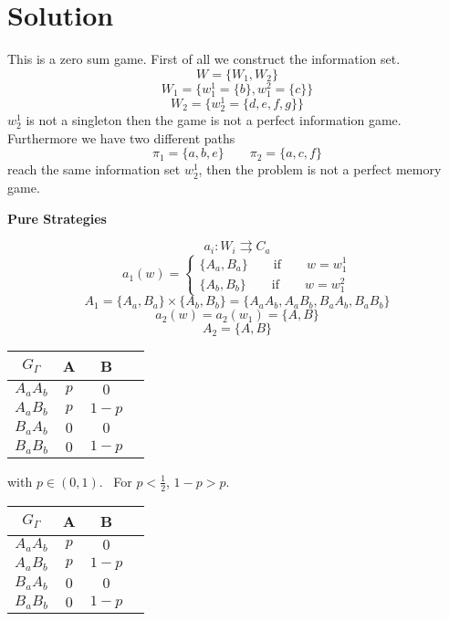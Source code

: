 \documentclass[a4paper, twoside, openany]{book}
\renewcommand{\Gamma}{\varGamma}
\begin{document}
\section*{Solution}
This is a zero sum game. First of all we construct the information set.
$$W = \{ W_1, W_2 \}$$
$$W_1 = \{ w_1^1 = \{ b \} , w_1^2 = \{ c \} \} $$
$$W_2 = \{ w_2^1 = \{ d, e, f, g \} \}$$
$w_2^1$ is not a singleton then the game is not a perfect information game. Furthermore we have two different paths
$$\pi_1 = \{ a, b, e \} \qquad \pi_2 = \{ a, c, f \}$$
reach the same information set $w_2^1$, then the problem is not a perfect memory game. \par  
\textbf{Pure Strategies} \par  
$$a_i : W_i \rightrightarrows C_a$$
$$a_1(w) = \begin{cases}
			\{ A_a, B_a \} \qquad \textrm{if} \qquad w = w_1^1 \\
			\{ A_b, B_b \} \qquad \textrm{if} \qquad w = w_1^2
		   \end{cases}$$
$$A_1 = \{ A_a, B_a \} \times \{ A_b , B_b \} = \{ A_a A_b, A_a B_b, B_a A_b, B_a B_b \}$$
$$a_2(w) = a_2(w_1) = \{ A, B \}$$
$$A_2 = \{ A, B \}$$
\begin{center}
\begin{tabular}{|c | c | c| c| }
\hline
$G_{\Gamma}$ & A & B   \\
\hline
$A_a A_b$ & $p$ & $0$\\
\hline 
$A_a B_b$ & $p$ &  $1 - p$\\
\hline  
$B_a  A_b$ & $0$ &  $0$\\  
\hline 
$B_a B_b$ & $0$ &  $1 - p$\\
\hline
\end{tabular}
\end{center}
with $p \in (0, 1)$. \
For $p < \frac{1}{2}$, $1 - p > p$.
\begin{center}
\begin{tabular}{|c | c | c| c| }
\hline
$G_{\Gamma}$ & A & B   \\
\hline
$A_a A_b$ & \underline{$p$} & \underline{$0$}\\
\hline 
$A_a B_b$ & \underline{\underline{$p$}} &  \underline{$1 - p$}\\
\hline  
$B_a A_b$ & \underline{$0$} &  \underline{$0$}\\  
\hline 
$B_a B_b$ & \underline{$0$} &  \underline{$1 - p$}\\
\hline
\end{tabular}
\end{center}
\end{document}
